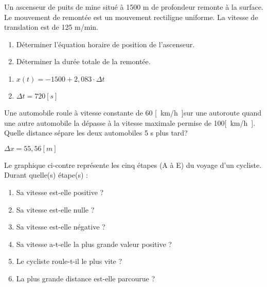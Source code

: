 \begin{exercise}
    Un ascenseur de puits de mine situé à 1500 m de profondeur remonte à la surface. Le mouvement de remontée est un mouvement rectiligne uniforme. La vitesse de translation est de 125 m/min.
    \begin{enumerate}[label=\alph*)]
        \item Déterminer l'équation horaire de position de l'ascenseur.
        \item Déterminer la durée totale de la remontée.
    \end{enumerate}
\end{exercise}
\begin{solution}
    \begin{enumerate}[label=\alph*)]
        \item \(x(t)=-1500 + 2,083 \cdot \Delta t\)
        \item \(\Delta t=720[s]\)
    \end{enumerate}
\end{solution}

\begin{exercise}
    Une automobile roule à vitesse constante de 60 \unit{[km/h]}sur une autoroute quand une autre automobile la dépasse à la vitesse maximale permise de 100\unit{[km/h]}. Quelle distance sépare les deux automobiles 5 s plus tard?
\end{exercise}
\begin{solution}
    \(\Delta x=55,56\unit{[m]}\)
\end{solution}

\begin{exercise}
    Le graphique ci-contre représente les cinq étapes (A à E) du voyage d'un cycliste. Durant quelle(s) étape(s) :
    \begin{enumerate}[label=\alph*)]
        \item Sa vitesse est-elle positive ?
        \item Sa vitesse est-elle nulle ?
        \item Sa vitesse est-elle négative ?
        \item Sa vitesse a-t-elle la plus grande valeur positive ?
        \item Le cycliste roule-t-il le plus vite ?
        \item La plus grande distance est-elle parcourue ?
    \end{enumerate}

\end{exercise}
\begin{solution}
\end{solution}

